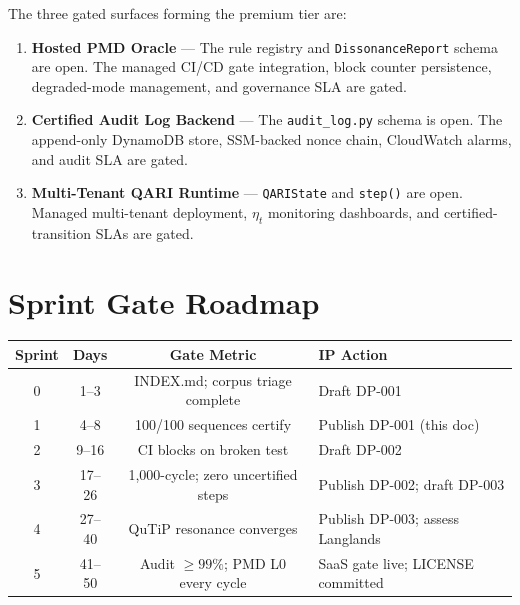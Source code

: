 \documentclass[12pt,letterpaper]{article}
\begin{document}
The three gated surfaces forming the premium tier are:

\begin{enumerate}
  \item \textbf{Hosted PMD Oracle} --- The rule registry and
        \texttt{DissonanceReport} schema are open. The managed CI/CD
        gate integration, block counter persistence, degraded-mode
        management, and governance SLA are gated.
  \item \textbf{Certified Audit Log Backend} --- The
        \texttt{audit\_log.py} schema is open. The append-only
        DynamoDB store, SSM-backed nonce chain, CloudWatch alarms,
        and audit SLA are gated.
  \item \textbf{Multi-Tenant QARI Runtime} --- \texttt{QARIState}
        and \texttt{step()} are open. Managed multi-tenant deployment,
        $\eta_t$ monitoring dashboards, and certified-transition SLAs
        are gated.
\end{enumerate}

\section{Sprint Gate Roadmap}

\begin{center}
\begin{longtable}{cccl}
  \toprule
  \textbf{Sprint} & \textbf{Days} & \textbf{Gate Metric} & \textbf{IP Action} \\
  \midrule
  0 & 1--3   & INDEX.md; corpus triage complete     & Draft DP-001 \\
  1 & 4--8   & 100/100 sequences certify             & Publish DP-001 (this doc) \\
  2 & 9--16  & CI blocks on broken test              & Draft DP-002 \\
  3 & 17--26 & 1{,}000-cycle; zero uncertified steps & Publish DP-002; draft DP-003 \\
  4 & 27--40 & QuTiP resonance converges             & Publish DP-003; assess Langlands \\
  5 & 41--50 & Audit $\geq 99\%$; PMD L0 every cycle & SaaS gate live; LICENSE committed \\
  \bottomrule
\end{longtable}
\end{center}
\end{document}

